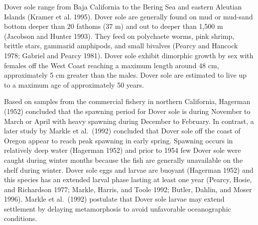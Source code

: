 \documentclass[11pt,
  english,
  a4paper,
]{article}
\begin{document}

Dover sole range from Baja California to the Bering Sea and eastern Aleutian Islands {(Kramer et al. 1995)\leavevmode\tagmcend\tagstructend}. Dover sole are generally found on mud or mud-sand bottom deeper than 20 fathoms (37 m) and out to deeper than 1,500 m {(Jacobson and Hunter 1993)\leavevmode\tagmcend\tagstructend}. They feed on polychaete worms, pink shrimp, brittle stars, gammarid amphipods, and small bivalves {(Pearcy and Hancock 1978; Gabriel and Pearcy 1981)\leavevmode\tagmcend\tagstructend}. Dover sole exhibit dimorphic growth by sex with females off the West Coast reaching a maximum length around 48 cm, approximately 5 cm greater than the males. Dover sole are estimated to live up to a maximum age of approximately 50 years.

\leavevmode\tagmcend\tagstructend\par


Based on samples from the commercial fishery in northern California, Hagerman {(1952)\leavevmode\tagmcend\tagstructend} concluded that the spawning period for Dover sole is during November to March or April with heavy spawning during December to February. In contrast, a later study by Markle et al.~{(1992)\leavevmode\tagmcend\tagstructend} concluded that Dover sole off the coast of Oregon appear to reach peak spawning in early spring. Spawning occurs in relatively deep water {(Hagerman 1952)\leavevmode\tagmcend\tagstructend} and prior to 1954 few Dover sole were caught during winter months because the fish are generally unavailable on the shelf during winter. Dover sole eggs and larvae are buoyant {(Hagerman 1952)\leavevmode\tagmcend\tagstructend} and this species has an extended larval phase lasting at least one year {(Pearcy, Hosie, and Richardson 1977; Markle, Harris, and Toole 1992; Butler, Dahlin, and Moser 1996)\leavevmode\tagmcend\tagstructend}. Markle et al.~{(1992)\leavevmode\tagmcend\tagstructend} postulate that Dover sole larvae may extend settlement by delaying metamorphosis to avoid unfavorable oceanographic conditions.
\end{document}
